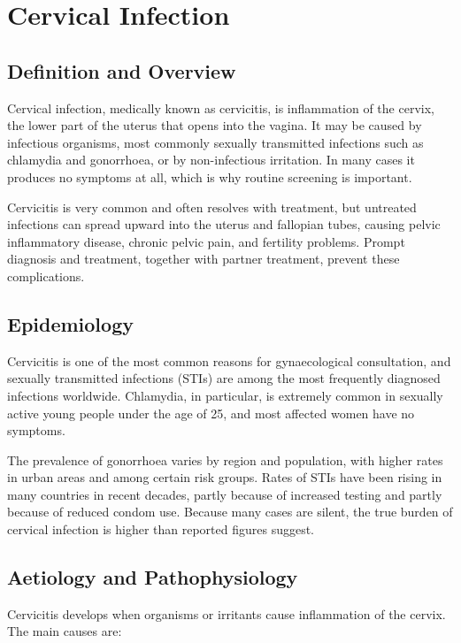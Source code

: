 \chapter{Cervical Infection}

\section*{Definition and Overview}
Cervical infection, medically known as cervicitis, is inflammation of the cervix, the lower part of the uterus that opens into the vagina. It may be caused by infectious organisms, most commonly sexually transmitted infections such as chlamydia and gonorrhoea, or by non-infectious irritation. In many cases it produces no symptoms at all, which is why routine screening is important.

Cervicitis is very common and often resolves with treatment, but untreated infections can spread upward into the uterus and fallopian tubes, causing pelvic inflammatory disease, chronic pelvic pain, and fertility problems. Prompt diagnosis and treatment, together with partner treatment, prevent these complications.

\section*{Epidemiology}
Cervicitis is one of the most common reasons for gynaecological consultation, and sexually transmitted infections (STIs) are among the most frequently diagnosed infections worldwide. Chlamydia, in particular, is extremely common in sexually active young people under the age of 25, and most affected women have no symptoms.

The prevalence of gonorrhoea varies by region and population, with higher rates in urban areas and among certain risk groups. Rates of STIs have been rising in many countries in recent decades, partly because of increased testing and partly because of reduced condom use. Because many cases are silent, the true burden of cervical infection is higher than reported figures suggest.

\section*{Aetiology and Pathophysiology}
Cervicitis develops when organisms or irritants cause inflammation of the cervix. The main causes are:

